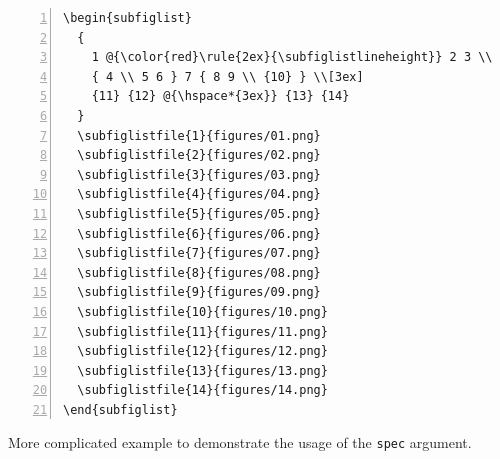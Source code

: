\documentclass[version=3.12,american]{scrartcl}
\begin{document}
\begin{listing}
\begin{minipage}{0.4\textwidth}
\begin{Verbatim}[numbers=left]
\begin{subfiglist}
  {
    1 @{\color{red}\rule{2ex}{\subfiglistlineheight}} 2 3 \\ 
    { 4 \\ 5 6 } 7 { 8 9 \\ {10} } \\[3ex]
    {11} {12} @{\hspace*{3ex}} {13} {14}
  }
  \subfiglistfile{1}{figures/01.png}
  \subfiglistfile{2}{figures/02.png}
  \subfiglistfile{3}{figures/03.png}
  \subfiglistfile{4}{figures/04.png}
  \subfiglistfile{5}{figures/05.png}
  \subfiglistfile{6}{figures/06.png}
  \subfiglistfile{7}{figures/07.png}
  \subfiglistfile{8}{figures/08.png}
  \subfiglistfile{9}{figures/09.png}
  \subfiglistfile{10}{figures/10.png}
  \subfiglistfile{11}{figures/11.png}
  \subfiglistfile{12}{figures/12.png}
  \subfiglistfile{13}{figures/13.png}
  \subfiglistfile{14}{figures/14.png}
\end{subfiglist}
\end{Verbatim}
\end{minipage}
\hfill
{}
\caption{More complicated example to demonstrate the usage of the \texttt{spec} argument.}
\label{lst:complicated}
\end{listing}
\end{document}
